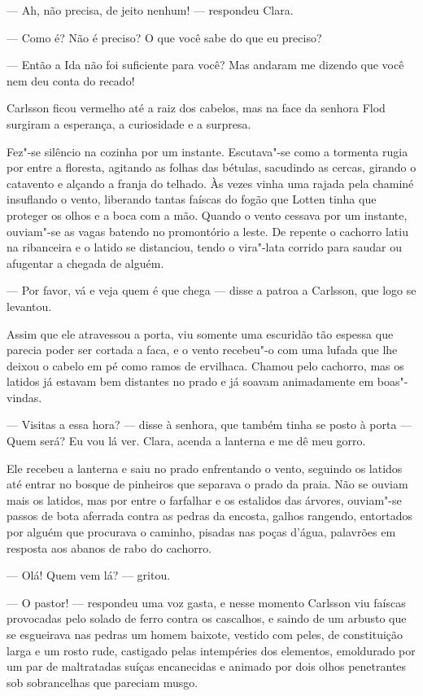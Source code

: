 --- Ah, não precisa, de jeito nenhum! --- respondeu Clara.

--- Como é? Não é preciso? O que você sabe do que eu preciso?

--- Então a Ida não foi suficiente para você? Mas andaram me dizendo que você
nem deu conta do recado!

Carlsson ficou vermelho até a raiz dos cabelos, mas na face da senhora Flod
surgiram a esperança, a curiosidade e a surpresa.

Fez"-se silêncio na cozinha por um instante. Escutava"-se como a tormenta
rugia por entre a floresta, agitando as folhas das bétulas, sacudindo as cercas,
girando o catavento e alçando a franja do telhado. Às vezes vinha uma rajada
pela chaminé insuflando o vento, liberando tantas faíscas do fogão que
Lotten tinha que proteger os olhos e a boca com a mão. Quando o vento cessava
por um instante, ouviam"-se as vagas batendo no promontório a leste. De repente
o cachorro latiu na ribanceira e o latido se distanciou, tendo o vira"-lata
corrido para saudar ou afugentar a chegada de alguém.

--- Por favor, vá e veja quem é que chega --- disse a patroa a Carlsson, que
logo se levantou.

Assim que ele atravessou a porta, viu somente uma escuridão tão espessa que parecia
poder ser cortada a faca, e o vento recebeu"-o com uma lufada que lhe deixou o
cabelo em pé como ramos de ervilhaca. Chamou pelo cachorro, mas os latidos
já estavam bem distantes no prado e já soavam animadamente em boas"-vindas.

--- Visitas a essa hora? --- disse à senhora, que também tinha se posto à porta ---
Quem será? Eu vou lá ver. Clara, acenda a lanterna e me dê meu gorro.

Ele recebeu a lanterna e saiu no prado enfrentando o vento, seguindo os latidos
até entrar no bosque de pinheiros que separava o prado da praia. Não se ouviam
mais os latidos, mas por entre o farfalhar e os estalidos das árvores, ouviam"-se
passos de bota aferrada contra as pedras da encosta, galhos rangendo, entortados
por alguém que procurava o caminho, pisadas nas poças d’água, palavrões em
resposta aos abanos de rabo do cachorro.

--- Olá! Quem vem lá? --- gritou.

--- O pastor! --- respondeu uma voz gasta, e nesse momento Carlsson viu faíscas
provocadas pelo solado de ferro contra os cascalhos, e saindo de um arbusto que
se esgueirava nas pedras um homem baixote, vestido com peles, de constituição
larga e um rosto rude, castigado pelas intempéries dos elementos, emoldurado por
um par de maltratadas suíças encanecidas e animado por dois olhos penetrantes
sob sobrancelhas que pareciam musgo.

